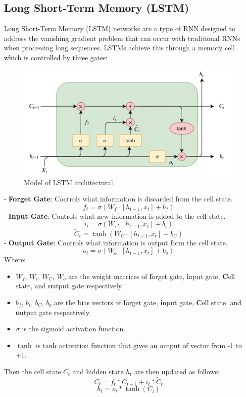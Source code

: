 \documentclass{ieeeojies}
\begin{document}
\subsection{Long Short-Term Memory (LSTM)}
Long Short-Term Memory (LSTM) networks are a type of RNN designed to address the vanishing gradient problem that can occur with traditional RNNs when processing long sequences. LSTMs achieve this through a memory cell which is controlled by three gates:\\
\begin{figure}[H]
    \centering
    \includegraphics[width=0.8\linewidth]{./image/LSTM.png}
    \caption{Model of LSTM architectural}
    \label{fig:8}
\end{figure}
\noindent
- \textbf{Forget Gate}: Controls what information is discarded from the cell state.
\begin{dmath*}
    f_t = \sigma(W_f \cdot [h_{t-1}, x_t] + b_f)
\end{dmath*}
- \textbf{Input Gate}: Controls what new information is added to the cell state.
\begin{dmath*}
    i_t = \sigma(W_i \cdot [h_{t-1}, x_t] + b_i)
\end{dmath*}
\begin{dmath*}
    \tilde{C}_t = \tanh(W_C \cdot [h_{t-1}, x_t] + b_C)
\end{dmath*}
- \textbf{Output Gate}: Controls what information is output form the cell state.
\begin{dmath*}
    o_t = \sigma(W_o \cdot [h_{t-1}, x_t] + b_o)
\end{dmath*}
Where:
\begin{itemize}
    \item \(W_f\), \(W_i\), \(W_C\), \(W_o\) are the weight matrices of \textbf{f}orget gate, \textbf{i}nput gate, \textbf{C}ell state, and \textbf{o}utput gate respectively.
    \item \(b_f\), \(b_i\), \(b_C\), \(b_o\) are the bias vectors of  \textbf{f}orget gate, \textbf{i}nput gate, \textbf{C}ell state, and \textbf{o}utput gate respectively.
    \item \(\sigma\) is the sigmoid activation function.
    \item \(\tanh\) is tanh activation function that gives an output of vector from -1 to +1.
\end{itemize}
Then the cell state \(C_t\) and hidden state \(h_t\) are then updated as follows:
\begin{dmath*}
    C_t = f_t * C_{t-1} + i_t * \tilde{C}_t
\end{dmath*}
\begin{dmath*}
    h_t = o_t * \tanh(C_t)
\end{dmath*}
\end{document}
